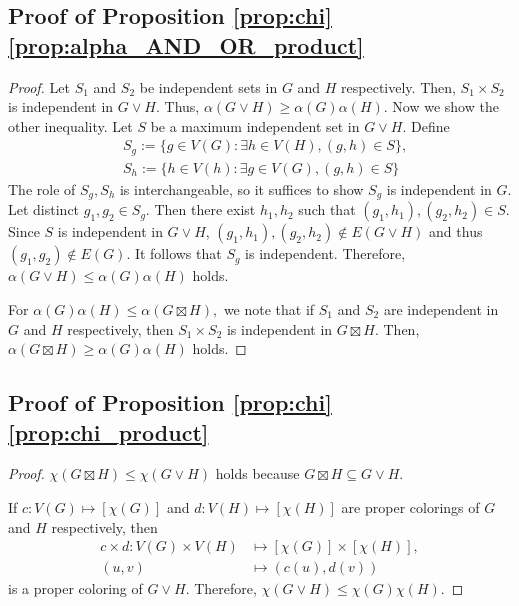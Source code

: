 \documentclass[journal, onecolumn, draftcls]{IEEEtran}
\theoremstyle{definition}
\begin{document}
\subsection{Proof of Proposition \ref{prop:chi} \ref{prop:alpha_AND_OR_product}}
\begin{proof} 




    Let $S_1$ and $S_2$ be independent sets in $G$ and $H$ respectively. Then, $S_1\times S_2$ is independent in $G\lor H$. Thus, $\alpha(G\lor H) \ge \alpha(G)\alpha(H)$. Now we show the other inequality. Let $S$ be a maximum independent set in $G\lor H$. Define 
    \begin{align*}
        &S_g := \{g\in V(G): \exists h\in V(H), (g,h) \in S\},
        \\  &S_h := \{h\in V(h): \exists g\in V(G), (g,h) \in S\}
    \end{align*}
    The role of $S_g,S_h$ is interchangeable, so it suffices to show $S_g$ is independent in $G$. Let distinct $g_1,g_2\in S_g$. Then there exist $h_1,h_2$ such that   $(g_1,h_1),(g_2,h_2)\in S$. Since $S$ is independent in $G\lor H$, $(g_1,h_1),(g_2,h_2)\notin E(G\lor H)$ and thus $(g_1,g_2)\notin E(G)$. It follows that $S_g$ is  independent.  Therefore, $\alpha(G\lor H) \le \alpha(G)\alpha(H)$ holds.
    
For $\alpha(G)\alpha(H)\le \alpha(G\boxtimes H),$ we note that if   $S_1$ and $S_2$ are independent in $G$ and $H$ respectively, then $S_1\times S_2$ is independent in $G\boxtimes H$. Then, $\alpha(G\boxtimes H) \ge \alpha(G) \alpha(H)$ holds.
\end{proof}



 



\subsection{Proof of Proposition \ref{prop:chi} \ref{prop:chi_product}}
\begin{proof}
$\chi(G\boxtimes H)\le\chi(G\lor H)$ holds because $G\boxtimes H\subseteq G\lor H$.

If $c:V(G)\mapsto [\chi(G)]$ and $d:V(H)\mapsto [\chi(H)]$ are proper colorings  of $G$ and $H$ respectively, then 
\begin{align*}c\times d:V(G)\times V(H)&\mapsto [\chi(G)]\times [\chi(H)],\\
(u,v) &\mapsto (c(u),d(v))
\end{align*}  is a proper coloring of $G\lor H$. Therefore, $\chi(G \lor H) \le \chi(G)\chi(H).$
\end{proof}
\end{document}
